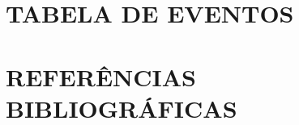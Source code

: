 \documentclass[12pt]{iptex}
\renewcommand{\refname}{REFERÊNCIAS}
\renewcommand{\refname}{REFERENCES}
\begin{document}




\clearpage
\newpage



\section{TABELA DE EVENTOS}
\label{sec:tabelas}

\newpage


\newpage

\section{REFERÊNCIAS BIBLIOGRÁFICAS}
\renewcommand{\refname}{REFERÊNCIAS}

\end{document}
